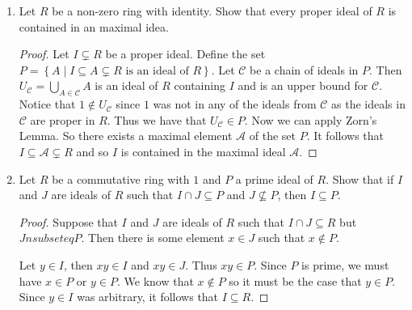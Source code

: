 \documentclass{article}
\theoremstyle{definition}
\newcommand{\Z}{\mathbb{Z}}
\newcommand{\set}[1]{\left\{#1\right\}}
\begin{document}
\begin{enumerate}
            \begin{proof}
                For (a) since $M$ is a maximal ideal then $R/M$ is a field and thus an integral domain. Since $R/M$ is an integral domain, then $M$ is a prime ideal of $R$.

                For (b) note that $\Z[x]/(x) \equiv \Z$ so $(x)$ is a prime ideal of $\Z[x]$ but $(x)$ is not maximal in $\Z[x]$ since $\Z$ is not a field.
            \end{proof}
            
            \item Let $R$ be a non-zero ring with identity. Show that every proper ideal of $R$ is contained in an maximal idea. 
            
            \begin{proof}
                Let $I \subsetneq R$ be a proper ideal. Define the set $P=\set{A \mid I \subseteq A\subsetneq R \text{ is an ideal of }R}$. Let $\mathcal{C}$ be a chain of ideals in $P$. Then $U_\mathcal{C}=\bigcup _{A\in \mathcal{C}}A$ is an ideal of $R$ containing $I$ and is an upper bound for $\mathcal{C}$. Notice that $1\notin U_\mathcal{C}$ since $1$ was not in any of the ideals from $\mathcal{C}$ as the ideals in $\mathcal{C}$ are proper in $R$. Thus we have that $U_\mathcal{C}\in P$. Now we can apply Zorn's Lemma. So there exists a maximal element $\mathscr{A}$ of the set $P$. It follows that $I\subseteq \mathscr{A}\subsetneq R$ and so $I$ is contained in the maximal ideal $\mathscr{A}$.
                
            \end{proof}
            
            \item Let $R$ be a commutative ring with $1$ and $P$ a prime ideal of $R$. Show that if $I$ and $J$ are ideals of $R$ such that $I\cap J \subseteq P$ and $J\nsubseteq P$, then $I\subseteq P$.
            
            \begin{proof}
                Suppose that $I$ and $J$ are ideals of $R$ such that $I \cap J \subseteq R$ but $J nsubseteq P$. Then there is some element $x\in J$ such that $x\notin P$. 
                
                Let $y\in I$, then $xy\in I$ and $xy\in J$. Thus $xy\in P$. Since $P$ is prime, we must have $x\in P$ or $y\in P$. We know that $x\notin P$ so it must be the case that $y\in P$. Since $y\in I$ was arbitrary, it follows that $I\subseteq R$. 
            \end{proof}
            

\end{enumerate}
\end{document}
